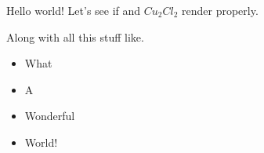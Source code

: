 Hello world! Let's see if  and $Cu_2 Cl_2$ render properly.

Along with all this stuff like.
\begin{itemize}
\item What

\item A

\item Wonderful
\item World!
\end{itemize}